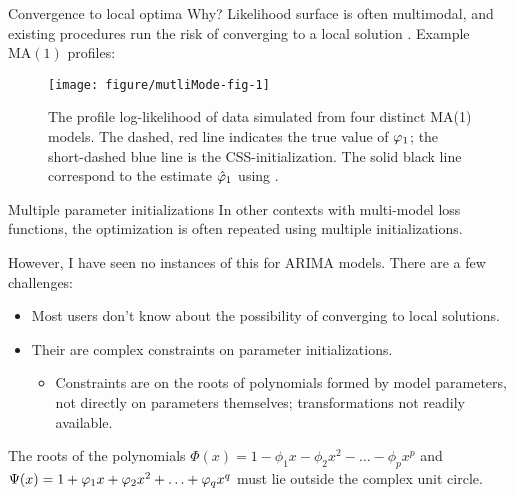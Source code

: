 \documentclass[aspectratio=169]{beamer}\usepackage[]{graphicx}\usepackage[]{xcolor}
\makeatletter
\def\maxwidth{ %
  \ifdim\Gin@nat@width>\linewidth
    \linewidth
  \else
    \Gin@nat@width
  \fi
}
\newenvironment{knitrout}{}{} %
\makeatother
\begin{document}
\begin{frame}{Convergence to local optima}
  Why? Likelihood surface is often multimodal, and existing procedures run the risk of converging to a local solution \citep{ripley2002}. Example $\mathrm{MA}(1)$ profiles:


  

\begin{figure}[ht]
\begin{knitrout}
\color{fgcolor}
\texttt{[image: figure/mutliMode-fig-1]} 
\end{knitrout}
\caption{\label{fig:multiMode}The profile log-likelihood of data simulated from four distinct MA(1) models. The dashed, red line indicates the true value of $\varphi_1$; the short-dashed blue line is the CSS-initialization. The solid black line correspond to the estimate $\hat{\varphi}_1$ using .}
\end{figure}

\end{frame}

\begin{frame}{Multiple parameter initializations}
  In other contexts with multi-model loss functions, the optimization is often repeated using multiple initializations.
  
  However, I have seen \alert{no instances} of this for $\mathrm{ARIMA}$ models. There are a few challenges: 
  \begin{itemize}
    \item Most users don't know about the possibility of converging to local solutions. 
    \item Their are complex constraints on parameter initializations. 
    \begin{itemize}
      \item Constraints are on the roots of polynomials formed by model parameters, not directly on parameters themselves; transformations not readily available.
    \end{itemize}
  \end{itemize}
  \pause
  The roots of the polynomials $\Phi(x) = 1 - \phi_1 x - \phi_2x^2 - \ldots - \phi_px^p$ and $\Psi(x) = 1 + \varphi_1 x + \varphi_2x^2 + \ldots + \varphi_qx^q$ must lie outside the complex unit circle.
\end{frame}
\end{document}
